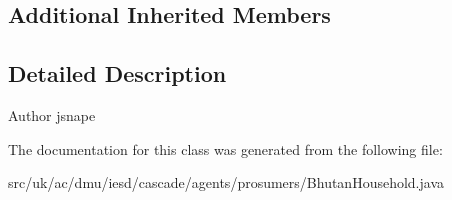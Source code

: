 \subsection*{Additional Inherited Members}


\subsection{Detailed Description}
\begin{DoxyAuthor}{Author}
jsnape 
\end{DoxyAuthor}


The documentation for this class was generated from the following file\-:\begin{DoxyCompactItemize}
\item 
src/uk/ac/dmu/iesd/cascade/agents/prosumers/Bhutan\-Household.\-java\end{DoxyCompactItemize}
